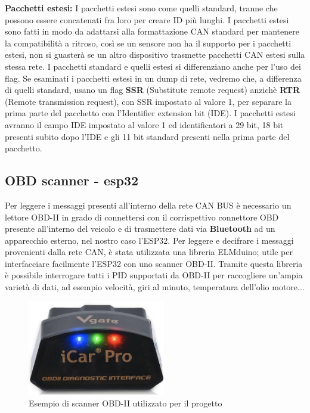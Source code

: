 \documentclass[12pt, a4paper, italian]{report}
\numberwithin{figure}{chapter}
\numberwithin{table}{chapter}
\begin{document}
\textbf{Pacchetti estesi:}
I pacchetti estesi sono come quelli standard, tranne che possono essere concatenati fra loro per creare ID più lunghi. I pacchetti estesi sono fatti in modo da adattarsi alla formattazione CAN standard per mantenere la compatibilità a ritroso, così se un sensore non ha il supporto per i pacchetti estesi, non si guasterà se un altro dispositivo trasmette pacchetti CAN estesi sulla stessa rete. I pacchetti standard e quelli estesi si differenziano anche per l'uso dei flag. Se esaminati i pacchetti estesi in un dump di rete, vedremo che, a differenza di quelli standard, usano un flag \textbf{SSR} (Substitute remote request) anzichè \textbf{RTR} (Remote transmission request), con SSR impostato al valore 1, per separare la prima parte del pacchetto con l'Identifier extension bit (IDE). I pacchetti estesi avranno il campo IDE impostato al valore 1 ed identificatori a 29 bit, 18 bit presenti subito dopo l'IDE e gli 11 bit standard presenti nella prima parte del pacchetto.

\subsection{OBD scanner - esp32}
Per leggere i messaggi presenti all'interno della rete CAN BUS è necessario un lettore OBD-II in grado di connettersi con il corrispettivo connettore OBD presente all'interno del veicolo e di trasmettere dati via \textbf{Bluetooth} ad un apparecchio esterno, nel nostro caso l'ESP32. Per leggere e decifrare i messaggi provenienti dalla rete CAN, è stata utilizzata una libreria ELMduino; utile per interfacciare facilmente l'ESP32 con uno scanner OBD-II. Tramite questa libreria è possibile interrogare tutti i PID supportati da OBD-II per raccogliere un'ampia varietà di dati, ad esempio velocità, giri al minuto, temperatura dell'olio motore...

\begin{figure}[h]
  \centering
  \includegraphics[width=6cm]{LettoreScannerOBD-II.png}
  \caption{Esempio di scanner OBD-II utilizzato per il progetto}
  \label{fig:scannerOBD-II}
\end{figure}
\end{document}
